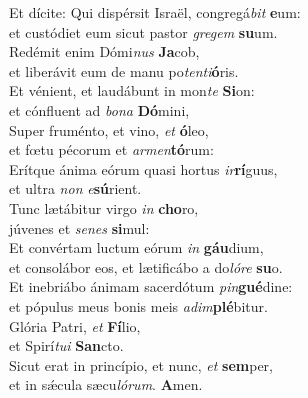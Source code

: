 \evenverse Et dícite: Qui dispérsit Israël, congregá\textit{bit} \textbf{e}um:~\*\\
\evenverse et custódiet eum sicut pastor \textit{gre}\textit{gem} \textbf{su}um.\\
\oddverse Redémit enim Dómi\textit{nus} \textbf{Ja}cob,~\*\\
\oddverse et liberávit eum de manu po\textit{ten}\textit{ti}\textbf{ó}ris.\\
\evenverse Et vénient, et laudábunt in mon\textit{te} \textbf{Si}on:~\*\\
\evenverse et cónfluent ad \textit{bo}\textit{na} \textbf{Dó}mini,\\
\oddverse Super fruménto, et vino, \textit{et} \textbf{ó}leo,~\*\\
\oddverse et fœtu pécorum et \textit{ar}\textit{men}\textbf{tó}rum:\\
\evenverse Erítque ánima eórum quasi hortus \textit{ir}\textbf{rí}guus,~\*\\
\evenverse et ultra \textit{non} \textit{e}\textbf{sú}rient.\\
\oddverse Tunc lætábitur virgo \textit{in} \textbf{cho}ro,~\*\\
\oddverse júvenes et \textit{se}\textit{nes} \textbf{si}mul:\\
\evenverse Et convértam luctum eórum \textit{in} \textbf{gáu}dium,~\*\\
\evenverse et consolábor eos, et lætificábo a do\textit{ló}\textit{re} \textbf{su}o.\\
\oddverse Et inebriábo ánimam sacerdótum \textit{pin}\textbf{gué}dine:~\*\\
\oddverse et pópulus meus bonis meis \textit{a}\textit{dim}\textbf{plé}bitur.\\
\evenverse Glória Patri, \textit{et} \textbf{Fí}lio,~\*\\
\evenverse et Spirí\textit{tu}\textit{i} \textbf{San}cto.\\
\oddverse Sicut erat in princípio, et nunc, \textit{et} \textbf{sem}per,~\*\\
\oddverse et in sǽcula sæcu\textit{ló}\textit{rum}. \textbf{A}men.\\
